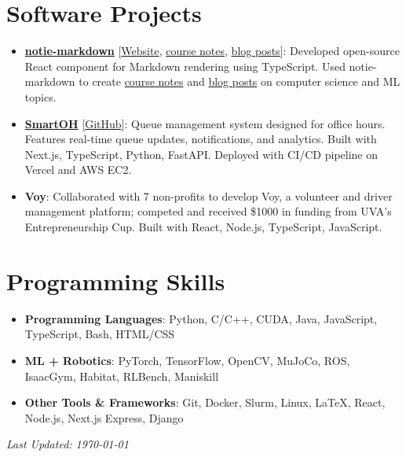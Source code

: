 \documentclass[letterpaper,11pt]{article}
\newcommand{\linkhref}[2]{\textcolor{linkblue}{\href{#1}{#2}}}
\begin{document}
\section{Software Projects}
\begin{itemize}[label={}, leftmargin=0pt]
  \item \textbf{\href{https://notie-markdown.vercel.app/}{notie-markdown}} [\linkhref{https://notie-markdown.vercel.app/}{Website}, \linkhref{https://www.brandonyifanyang.com/notes}{course notes}, \linkhref{https://www.brandonyifanyang.com/blog}{blog posts}]: Developed open-source React component for Markdown rendering using TypeScript. Used notie-markdown to create \href{https://www.brandonyifanyang.com/notes}{course notes} and \href{https://www.brandonyifanyang.com/blog}{blog posts} on computer science and ML topics.
  \item \textbf{\href{https://github.com/branyang02/smart-oh}{SmartOH}} [\linkhref{https://github.com/branyang02/smart-oh}{GitHub}]: Queue management system designed for office hours. Features real-time queue updates, notifications, and analytics. Built with Next.js, TypeScript, Python, FastAPI. Deployed with CI/CD pipeline on Vercel and AWS EC2.
  \item \textbf{Voy}: Collaborated with 7 non-profits to develop Voy, a volunteer and driver management platform; competed and received \$1000 in funding from UVA's Entrepreneurship Cup. Built with React, Node.js, TypeScript, JavaScript.
\end{itemize}

\section{Programming Skills}
\begin{itemize}[label={}, leftmargin=0pt]
  \item \textbf{Programming Languages}: Python, C/C++, CUDA, Java, JavaScript, TypeScript, Bash, HTML/CSS
  \item \textbf{ML + Robotics}: PyTorch, TensorFlow, OpenCV, MuJoCo, ROS, IsaacGym, Habitat, RLBench, Maniskill
  \item \textbf{Other Tools \& Frameworks}: Git, Docker, Slurm, Linux, \LaTeX, React, Node.js, Next.js Express, Django
\end{itemize}

\vfill
\noindent\textit{\small Last Updated: \today}
\end{document}
